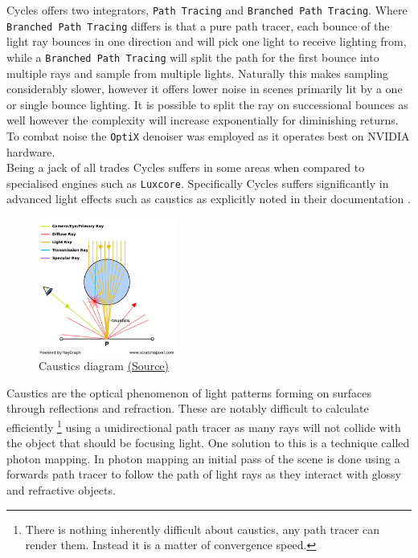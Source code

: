 \documentclass[11pt]{article}
\begin{document}
Cycles offers two integrators, \texttt{Path Tracing} and \texttt{Branched Path Tracing}. Where
\texttt{Branched Path Tracing}  differs is that a pure path tracer, each bounce of the
light ray bounces in one direction and will pick one light to receive lighting
from, while a \texttt{Branched Path Tracing} will split the path for the first bounce
into multiple rays and sample from multiple lights. Naturally this makes
sampling considerably slower, however it offers lower noise in scenes primarily
lit by a one or single bounce lighting. It is possible to split the ray on
successional bounces as well however the complexity will increase exponentially
for diminishing returns.\\

To combat noise the \texttt{OptiX} denoiser was employed as it operates best on NVIDIA
hardware.\\

Being a jack of all trades Cycles suffers in some areas when compared to
specialised engines such as \texttt{Luxcore}. Specifically Cycles suffers significantly
in advanced light effects such as caustics as explicitly noted in their
documentation \cite{blender-sampling}.\\

\begin{figure}[htbp]
\centering
\includegraphics[width=0.4\textwidth]{Images/caustics2.png}
\caption{\label{caustics}Caustics diagram \href{https://www.scratchapixel.com/lessons/3d-basic-rendering/global-illumination-path-tracing}{(Source)}}
\end{figure}
Caustics are the optical phenomenon of light patterns forming on surfaces
through reflections and refraction. These are notably difficult to calculate
efficiently \footnote{There is nothing inherently difficult about caustics, any path tracer can
render them. Instead it is a matter of convergence speed.} using a unidirectional path tracer as many rays will not
collide with the object that should be focusing light. One solution to this is a
technique called photon mapping. In photon mapping an initial pass of the scene
is done using a forwards path tracer to follow the path of light rays as they
interact with glossy and refractive objects.\\
\end{document}
